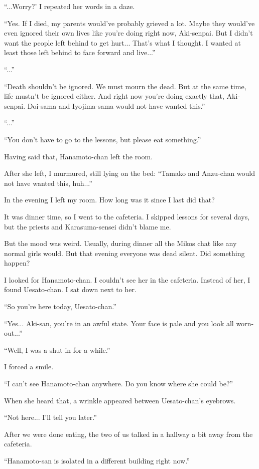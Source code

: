 ``...Worry?' I repeated her words in a daze.

``Yes. If I died, my parents would've probably grieved a lot. Maybe they would've even ignored their own lives like you're doing right now, Aki-senpai. But I didn't want the people left behind to get hurt... That's what I thought. I wanted at least those left behind to face forward and live...''

``...''

``Death shouldn't be ignored. We must mourn the dead. But at the same time, life mustn't be ignored either. And right now you're doing exactly that, Aki-senpai. Doi-sama and Iyojima-sama would not have wanted this.''

``...''

``You don't have to go to the lessons, but please eat something.''

Having said that, Hanamoto-chan left the room.

After she left, I murmured, still lying on the bed: ``Tamako and Anzu-chan would not have wanted this, huh...''

In the evening I left my room. How long was it since I last did that?

It was dinner time, so I went to the cafeteria. I skipped lessons for several days, but the priests and Karasuma-sensei didn't blame me.

But the mood was weird. Usually, during dinner all the Mikos chat like any normal girls would. But that evening everyone was dead silent. Did something happen?

I looked for Hanamoto-chan. I couldn't see her in the cafeteria. Instead of her, I found Uesato-chan. I sat down next to her.

``So you're here today, Uesato-chan.''

``Yes... Aki-san, you're in an awful state. Your face is pale and you look all worn-out...''

``Well, I was a shut-in for a while.''

I forced a smile.

``I can't see Hanamoto-chan anywhere. Do you know where she could be?''

When she heard that, a wrinkle appeared between Uesato-chan's eyebrows.

``Not here... I'll tell you later.''

After we were done eating, the two of us talked in a hallway a bit away from the cafeteria.

``Hanamoto-san is isolated in a different building right now.''

